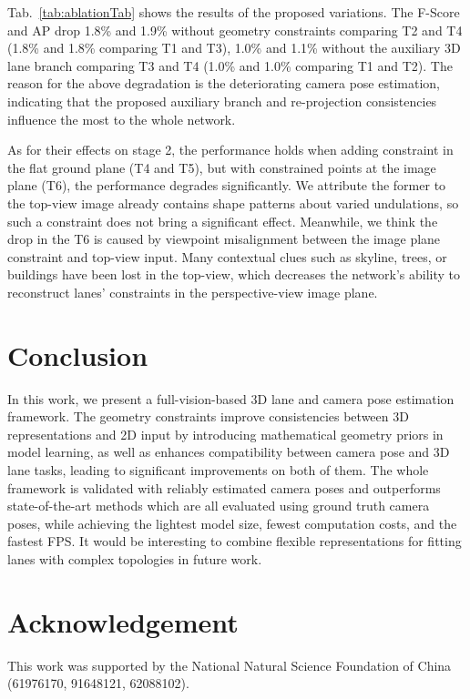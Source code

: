 \documentclass[letterpaper]{article} \usepackage{aaai22}  \usepackage{times}  \usepackage{helvet}  \usepackage{courier}  \usepackage[hyphens]{url}  \usepackage{graphicx} \urlstyle{rm} \def\UrlFont{\rm}  \usepackage{natbib}  \usepackage{caption}
\begin{document}
Tab.~\ref{tab:ablationTab} shows the results of the proposed variations. The F-Score and AP drop 1.8\% and 1.9\% without geometry constraints comparing T2 and T4 (1.8\% and 1.8\% comparing T1 and T3), 1.0\% and 1.1\% without the auxiliary 3D lane branch comparing T3 and T4 (1.0\% and 1.0\% comparing T1 and T2). The reason for the above degradation is the deteriorating camera pose estimation, indicating that the proposed auxiliary branch and re-projection consistencies influence the most to the whole network.

As for their effects on stage 2, the performance holds when adding constraint in the flat ground plane (T4 and T5), but with constrained points at the image plane (T6), the performance degrades significantly. We attribute the former to the top-view image already contains shape patterns about varied undulations, so such a constraint does not bring a significant effect. Meanwhile, we think the drop in the T6 is caused by viewpoint misalignment between the image plane constraint and top-view input. Many contextual clues such as skyline, trees, or buildings have been lost in the top-view, which decreases the network's ability to reconstruct lanes' constraints in the perspective-view image plane.   


\section{Conclusion}
In this work, we present a full-vision-based 3D lane and camera pose estimation framework. The geometry constraints improve consistencies between 3D representations and 2D input by introducing mathematical geometry priors in model learning, as well as enhances compatibility between camera pose and 3D lane tasks, leading to significant improvements on both of them. The whole framework is validated with reliably estimated camera poses and outperforms state-of-the-art methods which are all evaluated using ground truth camera poses, while achieving the lightest model size, fewest computation costs, and the fastest FPS. 
It would be interesting to combine flexible representations for fitting lanes with complex topologies in future work.

\section{Acknowledgement}
This work was supported by the National Natural Science Foundation of China (61976170, 91648121, 62088102).
\end{document}
